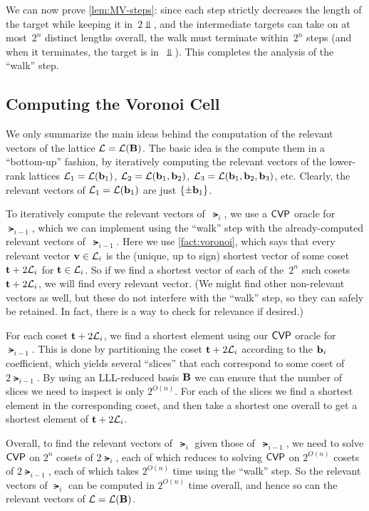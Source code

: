 \documentclass[11pt]{article}
\begin{document}
We can now prove \cref{lem:MV-steps}: since each step strictly
decreases the length of the target while keeping it in~$2\Vbar$, and
the intermediate targets can take on at most~$2^{n}$ distinct lengths
overall, the walk must terminate within~$2^{n}$ steps (and when it
terminates, the target is in~$\Vbar$). This completes the analysis of
the ``walk'' step.

\subsection{Computing the Voronoi Cell}
\label{sec:comp-voron-cell}

We only summarize the main ideas behind the computation of the
relevant vectors of the lattice $\mathcal{L}=\mathcal{L}(\mathbf{B})$. The basic idea is
the compute them in a ``bottom-up'' fashion, by iteratively computing
the relevant vectors of the lower-rank lattices
$\mathcal{L}_{1} = \mathcal{L}(\mathbf{b}_{1})$, $\mathcal{L}_{2} = \mathcal{L}(\mathbf{b}_{1}, \mathbf{b}_{2})$,
$\mathcal{L}_{3}=\mathcal{L}(\mathbf{b}_{1}, \mathbf{b}_{2}, \mathbf{b}_{3})$, etc. Clearly, the
relevant vectors of $\mathcal{L}_{1} = \mathcal{L}(\mathbf{b}_{1})$ are just
$\{\pm \mathbf{b}_{1}\}$.

To iteratively compute the relevant vectors of~$\lat_{i}$, we use a
$\mathsf{CVP}$ oracle for~$\lat_{i-1}$, which we can implement using the
``walk'' step with the already-computed relevant vectors
of~$\lat_{i-1}$. Here we use \cref{fact:voronoi}, which says that
every relevant vector $\mathbf{v} \in \mathcal{L}_{i}$ is the (unique, up to sign)
shortest vector of some coset $\mathbf{t} + 2\mathcal{L}_{i}$ for
$\mathbf{t} \in \mathcal{L}_{i}$. So if we find a shortest vector of each of
the~$2^{n}$ such cosets $\mathbf{t} + 2\mathcal{L}_{i}$, we will find every
relevant vector. (We might find other non-relevant vectors as well,
but these do not interfere with the ``walk'' step, so they can safely
be retained. In fact, there is a way to check for relevance if
desired.)

For each coset $\mathbf{t} + 2\mathcal{L}_{i}$, we find a shortest element using
our $\mathsf{CVP}$ oracle for~$\lat_{i-1}$. This is done by partitioning the
coset $\mathbf{t} + 2\mathcal{L}_{i}$ according to the $\mathbf{b}_{i}$ coefficient,
which yields several ``slices'' that each correspond to some coset of
$2\lat_{i-1}$. By using an LLL-reduced basis $\mathbf{B}$ we can ensure
that the number of slices we need to inspect is only $2^{O(n)}$. For
each of the slices we find a shortest element in the corresponding
coset, and then take a shortest one overall to get a shortest element
of $\mathbf{t} + 2\mathcal{L}_{i}$.

Overall, to find the relevant vectors of~$\lat_{i}$ given those
of~$\lat_{i-1}$, we need to solve $\mathsf{CVP}$ on $2^{n}$ cosets of
$2\lat_{i}$, each of which reduces to solving $\mathsf{CVP}$ on $2^{O(n)}$
cosets of $2\lat_{i-1}$, each of which takes $2^{O(n)}$ time using the
``walk'' step. So the relevant vectors of $\lat_{i}$ can be computed
in $2^{O(n)}$ time overall, and hence so can the relevant vectors of
$\mathcal{L} = \mathcal{L}(\mathbf{B})$.



\end{document}
